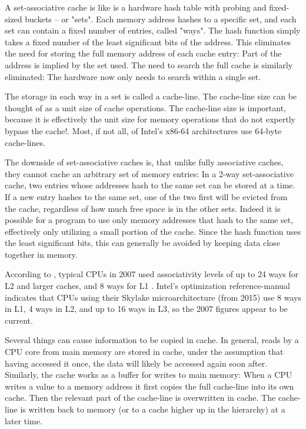A set-associative cache is like is a hardware hash table with probing and
fixed-sized buckets -- or "sets". Each memory address hashes to a specific set,
and each set can contain a fixed number of entries, called "ways". The hash
function simply takes a fixed number of the least significant bits of the
address. This eliminates the need for storing the full memory address of each
cache entry: Part of the address is implied by the set used. The need to search
the full cache is similarly eliminated: The hardware now only needs to search
within a single set.

The storage in each way in a set is called a cache-line. The cache-line
size can be thought of as a unit size of cache operations. The cache-line size is important, because it is effectively the unit size for memory operations that do not expertly bypass the cache!. Most, if not all, of
Intel's x86-64 architectures use 64-byte cache-lines\cite{inteloptimize}.

The downside of set-associative caches is, that unlike fully associative
caches, they cannot cache an arbitrary set of memory entries: In a 2-way
set-associative cache, two entries whose addresses hash to the same set can
be stored at a time. If a new entry hashes to the same set, one of the two
first will be evicted from the cache, regardless of how much free space is in
the other sets. Indeed it is possible for a program to use only memory
addresses that hash to the same set, effectively only utilizing a small portion
of the cache. Since the hash function uses the least significant bits, this can
generally be avoided by keeping data close together in memory. 

According to \citeauthor{whatprogrammersshouldknow}, typical
CPUs in 2007 used associativity levels of up to 24 ways for L2 and larger
caches, and 8 ways for L1 \cite{whatprogrammersshouldknow}. Intel's
optimization reference-manual \cite{inteloptimize} indicates that CPUs using their
Skylake microarchitecture (from 2015) use 8 ways in L1, 4 ways in L2, and up to
16 ways in L3, so the 2007 figures appear to be current.

Several things can cause information to be copied in cache. In general, reads by
a CPU core from main memory are stored in cache, under the
assumption that having accessed it once, the data will likely be accessed again
soon after. Similarly, the cache works as a buffer for writes to main memory:
When a CPU writes a value to a memory address it first copies the full
cache-line into its own cache. Then the relevant part of the cache-line is
overwritten in cache. The cache-line is written back to memory (or to a
cache higher up in the hierarchy) at a later time.

